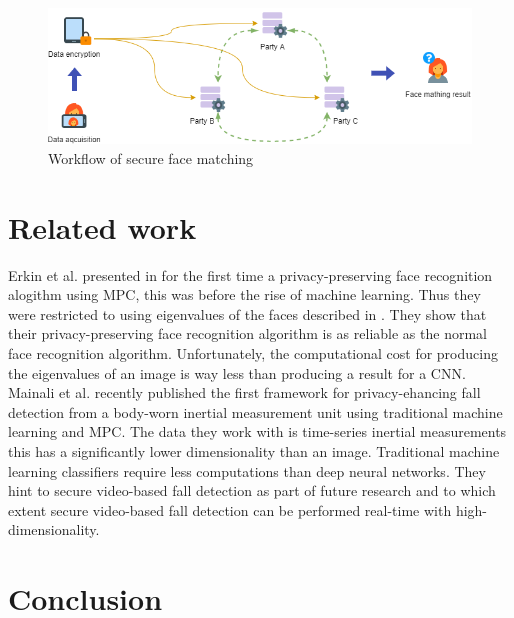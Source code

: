 \begin{figure}
  \includegraphics[width=\linewidth]{fig/workflow.png}
  \caption{Workflow of secure face matching}
  \label{fig:workflow}
\end{figure}

\section{Related work}
Erkin et al. presented in \cite{erkin2009privacy} for the first time a privacy-preserving face recognition alogithm using MPC, this was before the rise of machine learning. Thus they were restricted to using eigenvalues of the faces described in \cite{turk1991face}. They show that their privacy-preserving face recognition algorithm is as reliable as the normal face recognition algorithm. Unfortunately, the computational cost for producing the eigenvalues of an image is way less than producing a result for a CNN.\\

Mainali et al. recently published the first framework for privacy-ehancing fall detection from a body-worn inertial measurement unit using traditional machine learning and MPC. The data they work with is time-series inertial measurements this has a significantly lower dimensionality than an image. Traditional machine learning classifiers require less computations than deep neural networks. They hint to secure video-based fall detection as part of future research and to which extent secure video-based fall detection can be performed real-time with high-dimensionality.


\section{Conclusion}
